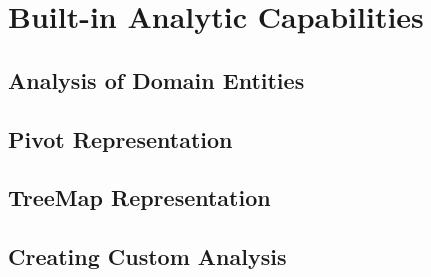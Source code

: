 \chapter{Built-in Analytic Capabilities}\label{ch01:06}

\section{Analysis of Domain Entities}

\section{Pivot Representation}

\section{TreeMap Representation}

\section{Creating Custom Analysis}